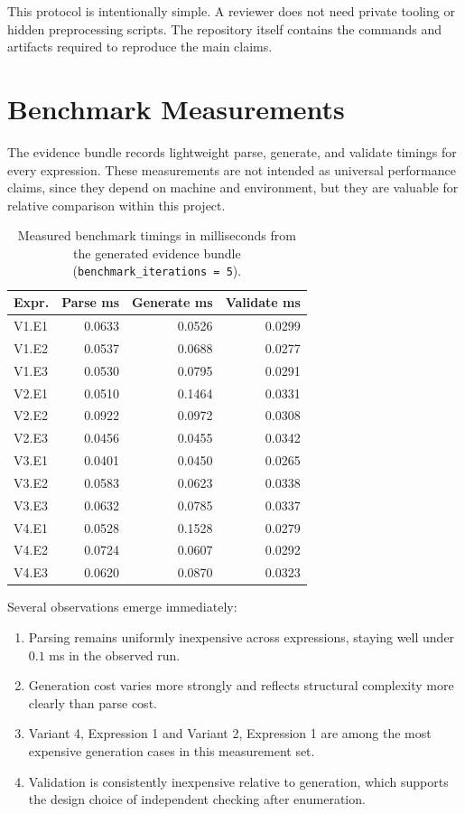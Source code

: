 \documentclass[a4paper,12pt]{article}
\begin{document}
This protocol is intentionally simple. A reviewer does not need private tooling or hidden preprocessing scripts. The repository itself contains the commands and artifacts required to reproduce the main claims.

\section{Benchmark Measurements}

The evidence bundle records lightweight parse, generate, and validate timings for every expression. These measurements are not intended as universal performance claims, since they depend on machine and environment, but they are valuable for relative comparison within this project.

\begin{table}[H]
    \centering
    \caption{Measured benchmark timings in milliseconds from the generated evidence bundle (\texttt{benchmark\_iterations = 5}).}
    \begin{tabular}{lrrr}
        \toprule
        \textbf{Expr.} & \textbf{Parse ms} & \textbf{Generate ms} & \textbf{Validate ms} \\
        \midrule
        V1.E1 & 0.0633 & 0.0526 & 0.0299 \\
        V1.E2 & 0.0537 & 0.0688 & 0.0277 \\
        V1.E3 & 0.0530 & 0.0795 & 0.0291 \\
        V2.E1 & 0.0510 & 0.1464 & 0.0331 \\
        V2.E2 & 0.0922 & 0.0972 & 0.0308 \\
        V2.E3 & 0.0456 & 0.0455 & 0.0342 \\
        V3.E1 & 0.0401 & 0.0450 & 0.0265 \\
        V3.E2 & 0.0583 & 0.0623 & 0.0338 \\
        V3.E3 & 0.0632 & 0.0785 & 0.0337 \\
        V4.E1 & 0.0528 & 0.1528 & 0.0279 \\
        V4.E2 & 0.0724 & 0.0607 & 0.0292 \\
        V4.E3 & 0.0620 & 0.0870 & 0.0323 \\
        \bottomrule
    \end{tabular}
\end{table}

Several observations emerge immediately:

\begin{enumerate}[label=\arabic*.]
    \item Parsing remains uniformly inexpensive across expressions, staying well under $0.1$ ms in the observed run.
    \item Generation cost varies more strongly and reflects structural complexity more clearly than parse cost.
    \item Variant 4, Expression 1 and Variant 2, Expression 1 are among the most expensive generation cases in this measurement set.
    \item Validation is consistently inexpensive relative to generation, which supports the design choice of independent checking after enumeration.
\end{enumerate}
\end{document}
